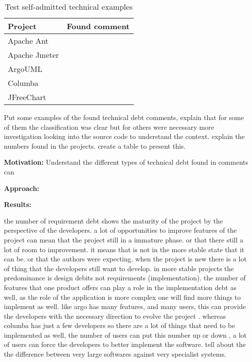 \begin{table}[!hbt]
      \begin{center}
            \caption{Test self-admitted technical examples}
            \label{tab:test_debt_detail}
            \begin{tabular}{l| c }
            \toprule
            \textbf{Project}      & \textbf{Found comment}     \\ \midrule 
              Apache Ant          &   \\                                   
              Apache Jmeter       &   \\                                   
              ArgoUML             &   \\                                   
              Columba             &   \\                                   
              JFreeChart          &   \\ \bottomrule
            \end{tabular}
      \end{center}
\end{table}


Put some examples of the found technical debt comments, explain that for some of them the classification was clear but for others were necessary more investigation looking into the source code to understand the context. explain the numbers found in the projects. create a table to present this.

\vspace{3mm}
\noindent\rqii
\vspace{3mm}

\noindent\textbf{Motivation:} Understand the different types of technical debt found in comments can 

\vspace{1mm}
\noindent\textbf{Approach:}

\vspace{1mm}
\noindent\textbf{Results:}  


the number of requirement debt shows the maturity of the project by the perspective of the developers. a lot of opportunities to improve features of the project can mean that the project still in a immature phase. or that there still a lot of room to improvement. it means that is not in the more stable state that it can be. or that the authors were expecting. when the project is new there is a lot of thing that the developers still want to develop. in more stable projects the predominance is design debits not requirements (implementation). the number of features that one product offers can play a role in the implementation debt as well, as the role of the application is more complex one will find more things to implement as well. like argo has many features, and many users, this can provide the developers with the necessary direction to evolve the project . whereas columba has just a few developers so there are a lot of things that need to be implemented as well, the number of users can put this number up or down , a lot of users can force the developers to better implement the software. tell about the the difference between very large softwares against very specialist systems. 


